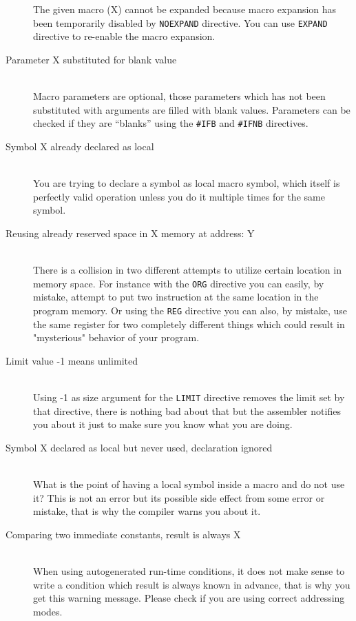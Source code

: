 \begin{description}
            The given macro (X) cannot be expanded because macro expansion has been temporarily disabled by \texttt{NOEXPAND} directive. You can use \texttt{EXPAND} directive to re-enable the macro expansion.
        \item[Parameter X substituted for blank value]~\\
            Macro parameters are optional, those parameters which has not been substituted with arguments are filled with blank values. Parameters can be checked if they are ``blanks'' using the \texttt{\#IFB} and \texttt{\#IFNB} directives.
        \item[Symbol X already declared as local]~\\
            You are trying to declare a symbol as local macro symbol, which itself is perfectly valid operation unless you do it multiple times for the same symbol.
        \item[Reusing already reserved space in X memory at address: Y]~\\
            There is a collision in two different attempts to utilize certain location in memory space. For instance with the \texttt{ORG} directive you can easily, by mistake, attempt to put two instruction at the same location in the program memory. Or using the \texttt{REG} directive you can also, by mistake, use the same register for two completely different things which could result in "mysterious" behavior of your program.
        \item[Limit value -1 means unlimited]~\\
            Using -1 as size argument for the \texttt{LIMIT} directive removes the limit set by that directive, there is nothing bad about that but the assembler notifies you about it just to make sure you know what you are doing.
        \item[Symbol X declared as local but never used, declaration ignored]~\\
            What is the point of having a local symbol inside a macro and do not use it? This is not an error but its possible side effect from some error or mistake, that is why the compiler warns you about it.
        \item[Comparing two immediate constants, result is always X]~\\
            When using autogenerated run-time conditions, it does not make sense to write a condition which result is always known in advance, that is why you get this warning message. Please check if you are using correct addressing modes.

\end{description}
